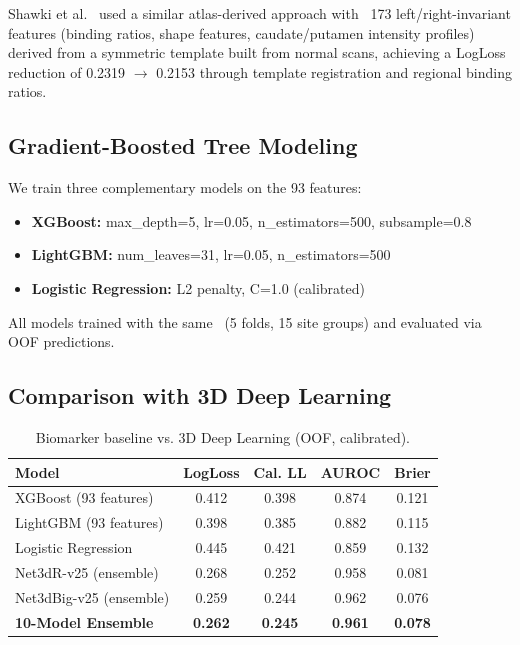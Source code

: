 Shawki et al.~\cite{shawki2024dat} used a similar atlas-derived approach with ~173 left/right-invariant features (binding ratios, shape features, caudate/putamen intensity profiles) derived from a symmetric template built from normal scans, achieving a LogLoss reduction of 0.2319 $\to$ 0.2153 through template registration and regional binding ratios.

\subsection{Gradient-Boosted Tree Modeling}
\label{sec:gbt_modeling}

We train three complementary models on the 93 features:
\begin{itemize}
    \item \textbf{XGBoost:} max\_depth=5, lr=0.05, n\_estimators=500, subsample=0.8
    \item \textbf{LightGBM:} num\_leaves=31, lr=0.05, n\_estimators=500
    \item \textbf{Logistic Regression:} L2 penalty, C=1.0 (calibrated)
\end{itemize}

All models trained with the same \cvname~(5 folds, 15 site groups) and evaluated via OOF predictions.

\subsection{Comparison with 3D Deep Learning}
\label{sec:biomarker_comparison}

\begin{table}[H]
\centering
\caption{Biomarker baseline vs. 3D Deep Learning (OOF, calibrated).}
\label{tab:biomarker_comparison}
\begin{tabular}{lcccc}
\toprule
\textbf{Model} & \textbf{LogLoss} & \textbf{Cal. LL} & \textbf{AUROC} & \textbf{Brier} \\
\midrule
XGBoost (93 features) & 0.412 & 0.398 & 0.874 & 0.121 \\
LightGBM (93 features) & 0.398 & 0.385 & 0.882 & 0.115 \\
Logistic Regression & 0.445 & 0.421 & 0.859 & 0.132 \\
\midrule
Net3dR-v25 (ensemble) & 0.268 & 0.252 & 0.958 & 0.081 \\
Net3dBig-v25 (ensemble) & 0.259 & 0.244 & 0.962 & 0.076 \\
\textbf{10-Model Ensemble} & \textbf{0.262} & \textbf{0.245} & \textbf{0.961} & \textbf{0.078} \\
\bottomrule
\end{tabular}
\end{table}

